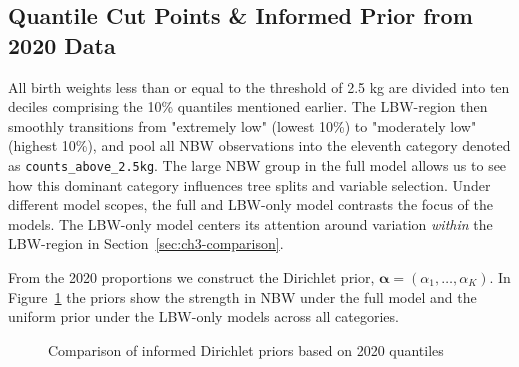 \subsection{Quantile Cut Points \& Informed Prior from 2020 Data}
\label{sec:ch3-cutpoints}
All birth weights less than or equal to the threshold of 2.5 kg are divided into ten deciles comprising the 10\% quantiles mentioned earlier. The LBW-region then smoothly transitions from "extremely low" (lowest 10\%) to "moderately low" (highest 10\%), and pool all NBW observations into the eleventh category denoted as \texttt{counts\_above\_2.5kg}. The large NBW group in the full model allows us to see how this dominant category influences tree splits and variable selection. Under different model scopes, the full and LBW-only model contrasts the focus of the models. The LBW-only model centers its attention around variation \emph{within} the LBW-region in Section~\ref{sec:ch3-comparison}.

From the 2020 proportions we construct the Dirichlet prior, \(\boldsymbol{\alpha} = (\alpha_1, \dots, \alpha_K)\). In Figure~\ref{fig:alphavec} the priors show the strength in NBW under the full model and the uniform prior under the LBW-only models across all categories. 

\begin{figure}[H]
    \centering
    \qquad
    \caption{Comparison of informed Dirichlet priors based on 2020 quantiles}
    \label{fig:alphavec}
\end{figure}


